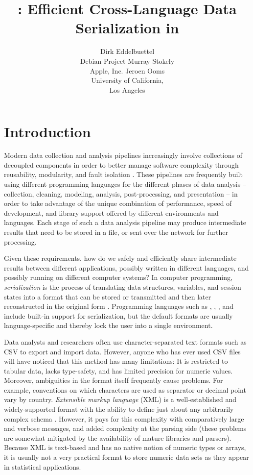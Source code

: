 \documentclass[article]{jss}
\author{Dirk Eddelbuettel\\Debian Project \And 
        Murray Stokely\\Apple, Inc. \And
        Jeroen Ooms\\University of California,\\Los Angeles}
\title{\pkg{RProtoBuf}: Efficient Cross-Language Data Serialization in \proglang{R}}
\begin{document}
\vspace*{-0.3cm}

\section{Introduction} 

Modern data collection and analysis pipelines increasingly involve collections
of decoupled components in order to better manage software complexity 
through reusability, modularity, and fault isolation \citep{Wegiel:2010:CTT:1932682.1869479}.
These pipelines are frequently built using different programming 
languages for the different phases of data analysis -- collection,
cleaning, modeling, analysis, post-processing, and
presentation -- in order to take advantage of the unique combination of
performance, speed of development, and library support offered by
different environments and languages.  Each stage of such a data
analysis pipeline may produce intermediate results that need to be
stored in a file, or sent over the network for further processing. 

Given these requirements, how do we safely and efficiently share
intermediate results between different applications, possibly written
in different languages, and possibly running on different computer
systems?  In computer programming, \emph{serialization} is the process
of translating data structures, variables, and session states into a
format that can be stored or transmitted and then later reconstructed
in the original form \citep{clinec++}.  Programming languages such as
 \citep{r},  \citep{julia},
, and  \citep{python} include built-in
support for serialization, but the default formats are usually
language-specific and thereby lock the user into a single environment.

Data analysts and researchers often use character-separated text
formats such as CSV \citep{shafranovich2005common} to export
and import data. However, anyone who has ever used CSV files
will have noticed that this method has many limitations: It is
restricted to tabular data, lacks type-safety, and has limited
precision for numeric values.  Moreover, ambiguities in the format
itself frequently cause problems.  For example, conventions on which
characters are used as separator or decimal point vary by country.
\emph{Extensible markup language} (XML) is a well-established
and widely-supported format with the ability to define just about any
arbitrarily complex schema \citep{nolan2013xml}. However, it pays for
this complexity with comparatively large and verbose messages, and
added complexity at the parsing side (these problems are somewhat
mitigated by the availability of mature libraries and
parsers). Because XML is text-based and has no native notion of
numeric types or arrays, it is usually not a very practical format to
store numeric data sets as they appear in statistical applications.
\end{document}
